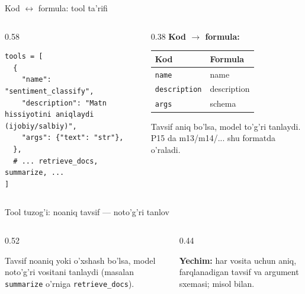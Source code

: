 \documentclass[aspectratio=169,11pt]{beamer}
\begin{document}
\begin{frame}[fragile]{Kod $\leftrightarrow$ formula: tool ta'rifi}
  \begin{columns}[T]
    \begin{column}{0.58\textwidth}
\begin{lstlisting}
tools = [
  {
    "name": "sentiment_classify",
    "description": "Matn hissiyotini aniqlaydi (ijobiy/salbiy)",
    "args": {"text": "str"},
  },
  # ... retrieve_docs, summarize, ...
]
\end{lstlisting}
    \end{column}
    \begin{column}{0.38\textwidth}
      \textbf{Kod $\to$ formula:}\\[3pt]
      \footnotesize
      \begin{tabular}{p{1.7cm}p{2.0cm}}
        \toprule
        Kod & Formula \\
        \midrule
        \texttt{name} & name \\
        \texttt{description} & description \\
        \texttt{args} & schema \\
        \bottomrule
      \end{tabular}
      \vspace{4pt}
      \begin{tcolorbox}[okbox,top=2pt,bottom=2pt]
        \footnotesize
        Tavsif aniq bo'lsa, model to'g'ri tanlaydi. P15 da m13/m14/... shu
        formatda o'raladi.
      \end{tcolorbox}
    \end{column}
  \end{columns}
\end{frame}

\begin{frame}{Tool tuzog'i: noaniq tavsif --- noto'g'ri tanlov}
  \begin{columns}[T]
    \begin{column}{0.52\textwidth}
      \begin{tcolorbox}[warnbox,title={Yomon description}]
        \small
        Tavsif noaniq yoki o'xshash bo'lsa, model noto'g'ri vositani tanlaydi
        (masalan \texttt{summarize} o'rniga \texttt{retrieve\_docs}).
      \end{tcolorbox}
    \end{column}
    \begin{column}{0.44\textwidth}
      \begin{tcolorbox}[okbox,top=2pt,bottom=2pt]
        \footnotesize
        \textbf{Yechim:} har vosita uchun aniq, farqlanadigan tavsif va
        argument sxemasi; misol bilan.
      \end{tcolorbox}
    \end{column}
  \end{columns}
\end{frame}
\end{document}

